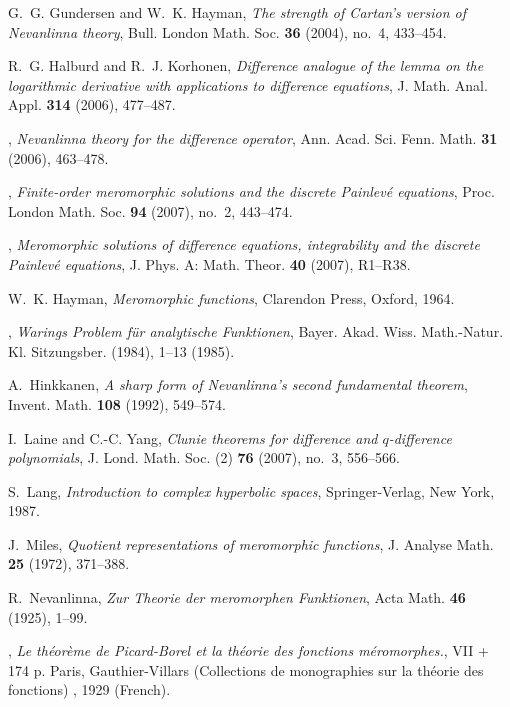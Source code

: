 \documentclass{amsart}
\theoremstyle{definition}
\numberwithin{equation}{section}
\numberwithin{theorem}{section}
\begin{document}
\begin{thebibliography}{10}
G.~G. Gundersen and W.~K. Hayman, \emph{The strength of {C}artan's version of
  {N}evanlinna theory}, Bull. London Math. Soc. \textbf{36} (2004), no.~4,
  433--454.

R.~G. Halburd and R.~J. Korhonen, \emph{Difference analogue of the lemma on the
  logarithmic derivative with applications to difference equations}, J. Math.
  Anal. Appl. \textbf{314} (2006), 477--487.

\bysame, \emph{Nevanlinna theory for the difference operator}, Ann. Acad. Sci.
  Fenn. Math. \textbf{31} (2006), 463--478.

\bysame, \emph{Finite-order meromorphic solutions and the discrete
  {P}ainlev{\'e} equations}, Proc. London Math. Soc. \textbf{94} (2007), no.~2,
  443--474.

\bysame, \emph{Meromorphic solutions of difference equations, integrability and
  the discrete {P}ainlev\'e equations}, J. Phys. A: Math. Theor. \textbf{40}
  (2007), R1--R38.

W.~K. Hayman, \emph{Meromorphic functions}, Clarendon Press, Oxford, 1964.

\bysame, \emph{Warings {P}roblem f\"ur analytische {F}unktionen}, Bayer. Akad.
  Wiss. Math.-Natur. Kl. Sitzungsber. (1984), 1--13 (1985).

A.~Hinkkanen, \emph{A sharp form of {N}evanlinna's second fundamental theorem},
  Invent. Math. \textbf{108} (1992), 549--574.

I.~Laine and C.-C. Yang, \emph{Clunie theorems for difference and
  {$q$}-difference polynomials}, J. Lond. Math. Soc. (2) \textbf{76} (2007),
  no.~3, 556--566. 

S.~Lang, \emph{Introduction to complex hyperbolic spaces}, Springer-Verlag, New
  York, 1987.

J.~Miles, \emph{Quotient representations of meromorphic functions}, J. Analyse
  Math. \textbf{25} (1972), 371--388.

R.~Nevanlinna, \emph{Zur {T}heorie der meromorphen {F}unktionen}, Acta Math.
  \textbf{46} (1925), 1--99.

\bysame, \emph{{Le th\'eor\`eme de Picard-Borel et la th\'eorie des fonctions
  m\'eromorphes.}}, {VII + 174 p. Paris, Gauthier-Villars (Collections de
  monographies sur la th\'eorie des fonctions) }, 1929 (French).


\end{thebibliography}
\end{document}
